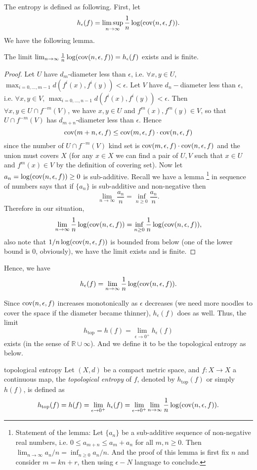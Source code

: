 \documentclass[12pt,a4paper]{article}
\begin{document}
	The entropy is defined as following. First, let
	$$
	h_\epsilon (f) = \limsup_{n\to \infty}\frac{1}{n} \log (\text{cov}(n,\epsilon,f)).
	$$
	We have the following lemma.
	\begin{lemma}{}{}
		The limit $\lim_{n\to\infty}\frac{1}{n}\log(\text{cov}(n,\epsilon,f))=h_{\epsilon}(f)$ exists and is finite. \label{lemma: limitexists}
	\end{lemma}
	\begin{proof}
		Let $U$ have $d_m$-diameter less than $\epsilon$, i.e. $\forall x,y\in U$, $\max_{i=0,\dots,m-1}d(f^i(x),f^i(y))<\epsilon$. Let $V$ have $d_n-$diameter less than $\epsilon$, i.e. $\forall x,y\in V$, $\max_{i=0,\dots,n-1}d(f^i(x),f^i(y))<\epsilon$. Then $\forall x,y\in U\cap f^{-m}(V)$, we have $x,y\in U$ and $f^m(x), f^m(y)\in V$, so that $U\cap f^{-m}(V)$ has $d_{m+n}$-diameter less than $\epsilon$. Hence 
		$$
		\text{cov}(m+n,\epsilon,f)\leq \text{cov}(m,\epsilon,f)\cdot \text{cov}(n,\epsilon,f)
		$$
		since the number of $U\cap f^{-m}(V)$ kind set is $\text{cov}(m,\epsilon,f)\cdot \text{cov}(n,\epsilon,f)$ and the union must covers $X$ (for any $x\in X$ we can find a pair of $U,V$ such that $x\in U$ and $f^m(x)\in V$ by the definition of covering set). Now let $a_n=\log(\text{cov}(n,\epsilon,f))\geq 0$ is sub-additive. Recall we have a lemma
		\footnote{Statement of the lemma: Let $\{a_n\}$ be a sub-additive sequence of non-negative real numbers, i.e. $0\leq a_{m+n}\leq a_m+a_n$ for all $m,n\geq 0$. Then $\lim_{n\to\infty} a_n/n = \inf_{n\geq 0} a_n/n$. And the proof of this lemma is first fix $n$ and consider $m=kn+r$, then using $\epsilon-N$ language to conclude.}
		 in sequence of numbers says that if $\{a_n\}$ is sub-additive and non-negative then
		$$
		\lim_{n\to\infty}\frac{a_n}{n}=\inf_{n\geq 0}\frac{a_n}{n}.
		$$
		Therefore in our situation, 
		$$
		\lim_{n\to\infty} \frac{1}{n} \log(\text{cov}(n,\epsilon,f)) = \inf_{n\geq0}\frac{1}{n} \log(\text{cov}(n,\epsilon,f)),
		$$
		also note that $1/n \log(\text{cov}(n,\epsilon,f))$ is bounded from below (one of the lower bound is 0, obviously), we have the limit exists and is finite.
	\end{proof}
	Hence, we have 
	$$
	h_\epsilon(f) = \lim_{n\to\infty}\frac{1}{n}\log(\text{cov}(n,\epsilon,f)).
	$$
	

	
	Since $\text{cov}(n,\epsilon,f)$ increases monotonically as $\epsilon$ decreases (we need more noodles to cover the space if the diameter became thinner), $h_\epsilon (f)$ does as well. Thus, the limit
	$$
	h_{\text{top}}=h(f)=\lim_{\epsilon\to 0^+} h_{\epsilon}(f)
	$$
	exists (in the sense of $\mathbb{R}\cup \infty$). And we define it to be the topological entropy as below.
	\begin{definition}{topological entropy}{}
		Let $(X,d)$ be a compact metric space, and $f:X\rightarrow X$ a continuous map, the \emph{topological entropy} of $f$, denoted by $h_{\text{top}}(f)$ or simply $h(f)$, is defined as
		$$
		h_{\text{top}}(f) =h(f)=\lim_{\epsilon\to 0^+}h_{\epsilon}(f)=\lim_{\epsilon\to 0^+}\lim_{n\to \infty}\frac{1}{n}\log(\text{cov}(n,\epsilon,f)).
		$$
	\end{definition}
	
\end{document}
